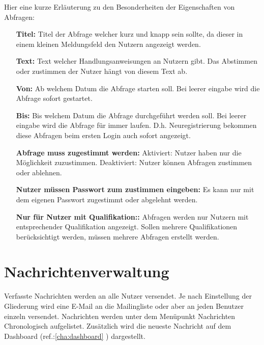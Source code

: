 Hier eine kurze Erläuterung zu den Besonderheiten der Eigenschaften von Abfragen:
\begin{itemize}
    \item[\textbf{Titel:}] Titel der Abfrage welcher kurz und knapp sein sollte, da dieser in einem kleinen Meldungsfeld den Nutzern angezeigt werden.
	\item[\textbf{Text:}] Text welcher Handlungsanweisungen an Nutzern gibt. Das Abstimmen oder zustimmen der Nutzer hängt von diesem Text ab.
	\item[\textbf{Von:}] Ab welchem Datum die Abfrage starten soll. Bei leerer eingabe wird die Abfrage sofort gestartet.
	\item[\textbf{Bis:}] Bis welchem Datum die Abfrage durchgeführt werden soll. Bei leerer eingabe wird die Abfrage für immer laufen. D.h. Neuregistrierung bekommen diese Abfragen beim ersten Login auch sofort angezeigt.
	\item[\textbf{Abfrage muss zugestimmt werden:}] Aktiviert: Nutzer haben nur die Möglichkeit zuzustimmen. Deaktiviert: Nutzer können Abfragen zustimmen oder ablehnen.
	\item[\textbf{Nutzer müssen Passwort zum zustimmen eingeben:}] Es kann nur mit dem eigenen Passwort zugestimmt oder abgelehnt werden.
	\item[\textbf{Nur für Nutzer mit Qualifikation::}] Abfragen werden nur Nutzern mit entsprechender Qualifikation angezeigt. Sollen mehrere Qualifikationen berücksichtigt werden, müssen mehrere Abfragen erstellt werden.
\end{itemize}

\section{Nachrichtenverwaltung}
\label{sec:admin_news}
Verfasste Nachrichten werden an alle Nutzer versendet. Je nach Einstellung der Gliederung wird eine E-Mail an die Mailingliste oder aber an jeden Benutzer einzeln versendet.
Nachrichten werden unter dem Menüpunkt \glqq Nachrichten\grqq{} Chronologisch aufgelistet. Zusätzlich wird die neueste Nachricht auf dem Dashboard (ref.:\ref{cha:dashboard} ) dargestellt.